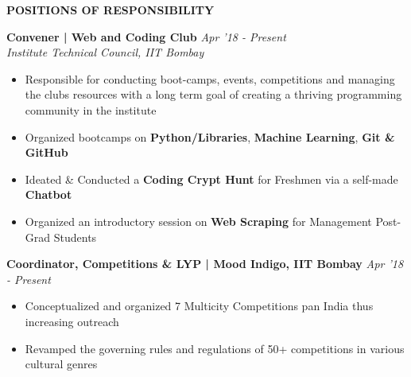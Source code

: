 \documentclass[11pt]{article}%
\begin{document}
\begin{flushleft}
\bf{\LARGE{P}\Large{OSITIONS} \LARGE{O}\Large{F} \LARGE{R}\Large{ESPONSIBILITY}}
\hrulefill
\end{flushleft}
\vspace{-4mm}
\vspace{-3mm}
{\flushleft \bf \large{Convener | Web and Coding Club}} \hfill {{{\em {Apr '18 - Present}}}}\\{\em{Institute Technical Council, IIT Bombay}}
\begin{itemize}
\setlength\itemsep{0.01em}
\vspace{-0.3cm}
\item Responsible for conducting boot-camps, events, competitions and managing the club\textsc{}s resources with a 
long term goal of creating a thriving programming community in the institute
\vspace{-1.2mm}
\item Organized bootcamps on {\bf Python/Libraries}, {\bf Machine Learning}, {\bf Git \& GitHub}
\vspace{-1.2mm}
\item Ideated \& Conducted a {\bf Coding Crypt Hunt} for Freshmen via a self-made {\bf Chatbot}
\vspace{-1.2mm}
\item Organized an introductory session on {\bf Web Scraping} for Management Post-Grad Students
\end{itemize}
\vspace{-1mm}
\vspace{-5mm}
{\flushleft \bf \large{Coordinator, Competitions \& LYP | Mood Indigo, IIT Bombay}} \hfill {{{\em {Apr '18 - Present}}}}
\begin{itemize}
\setlength\itemsep{0.01em}
\vspace{-0.2cm}
\item Conceptualized and organized 7 Multicity Competitions pan India thus increasing outreach
\vspace{-1.2mm}
\item Revamped the governing rules and regulations of 50+ competitions in various cultural genres
\end{itemize}
\vspace{-5mm}
\end{document}
